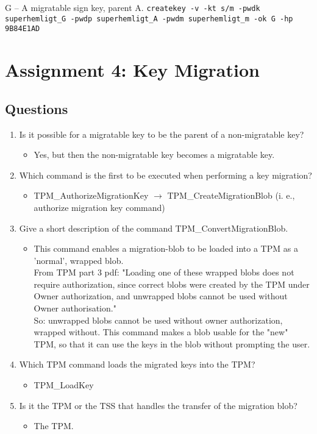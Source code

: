 \documentclass[10pt]{article}
\newcommand{\command}[1]{\texttt{#1}}
\begin{document}
    G -- A migratable sign key, parent A.
    \command{createkey -v -kt s/m -pwdk superhemligt\_G -pwdp superhemligt\_A -pwdm superhemligt\_m -ok G -hp 9B84E1AD}

\section{Assignment 4: Key Migration}
\subsection{Questions}
\begin{enumerate}
    \item {Is it possible for a migratable key to be the parent of a non-migratable key?} 
	\begin{itemize}
	    \item {Yes, but then the non-migratable key becomes a migratable key.}
	\end{itemize}
 
    \item {Which command is the first to be executed when performing a key migration?} 
	\begin{itemize}
	    \item {TPM\_AuthorizeMigrationKey  $\rightarrow$  TPM\_CreateMigrationBlob  (i. e., authorize migration key command)}
	\end{itemize}

    \item {Give a short description of the command TPM\_ConvertMigrationBlob.}
	\begin{itemize}
	    \item {This command enables a migration-blob to be loaded into a TPM as a 'normal', wrapped blob.\\
From TPM part 3 pdf: "Loading one of these wrapped blobs does not require authorization, since correct blobs were created by the TPM under Owner authorization, and unwrapped blobs cannot be used without Owner authorisation." \\
So: unwrapped blobs cannot be used without owner authorization, wrapped without. This command makes a blob usable for the "new" TPM, so that it can use the keys in the blob without prompting the user.}
	\end{itemize}

    \item {Which TPM command loads the migrated keys into the TPM?}
	\begin{itemize}
	    \item {TPM\_LoadKey}
	\end{itemize}

    \item {Is it the TPM or the TSS that handles the transfer of the migration blob? }
	\begin{itemize}
	    \item {The TPM.}
	\end{itemize}
\end{enumerate}
\end{document}
